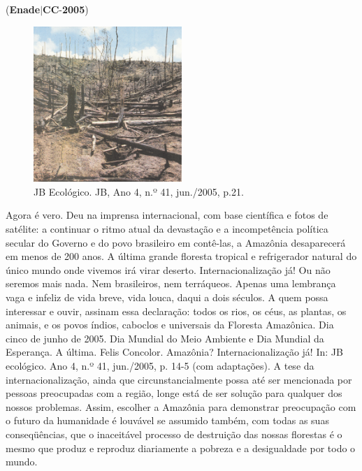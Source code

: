 \documentclass{exam}
\begin{document}
\begin{questions}
\begin{enumerate}[label=\alph*)]
	\end{enumerate}

\question (\textbf{Enade}$|$\textbf{CC}-\textbf{2005}) \begin{figure}[H]
	\begin{center}
		\includegraphics[width=0.5\textwidth]{CIENCIA_DA_COMPUTACAO_Prova2005-utf8_figuras/fig-0006.jpg}
		\caption{JB Ecológico. JB, Ano 4, n.º 41, jun./2005, p.21.}
	\end{center}
\end{figure}
Agora é vero. Deu na imprensa internacional, com base científica
e fotos de satélite: a continuar o ritmo atual da devastação e a
incompetência política secular do Governo e do povo brasileiro em
contê-las, a Amazônia desaparecerá em menos de 200 anos. A última
grande floresta tropical e refrigerador natural do único mundo onde
vivemos irá virar deserto.
Internacionalização já! Ou não seremos mais nada. Nem
brasileiros, nem terráqueos. Apenas uma lembrança vaga e infeliz de vida
breve, vida louca, daqui a dois séculos.
A quem possa interessar e ouvir, assinam essa declaração: todos
os rios, os céus, as plantas, os animais, e os povos índios, caboclos e
universais da Floresta Amazônica. Dia cinco de junho de 2005.
Dia Mundial do Meio Ambiente e Dia Mundial da Esperança. A última.
Felis Concolor. Amazônia? Internacionalização já! In:
JB ecológico. Ano 4, n.º 41, jun./2005, p. 14-5 (com adaptações).
A tese da internacionalização, ainda que circunstancialmente
possa até ser mencionada por pessoas preocupadas com a região, longe está de ser solução para qualquer dos nossos problemas.
Assim, escolher a Amazônia para demonstrar preocupação com o futuro da humanidade é louvável se assumido também, com
todas as suas conseqüências, que o inaceitável processo de destruição das nossas florestas é o mesmo que produz e reproduz
diariamente a pobreza e a desigualdade por todo o mundo.

\end{questions}
\end{document}
